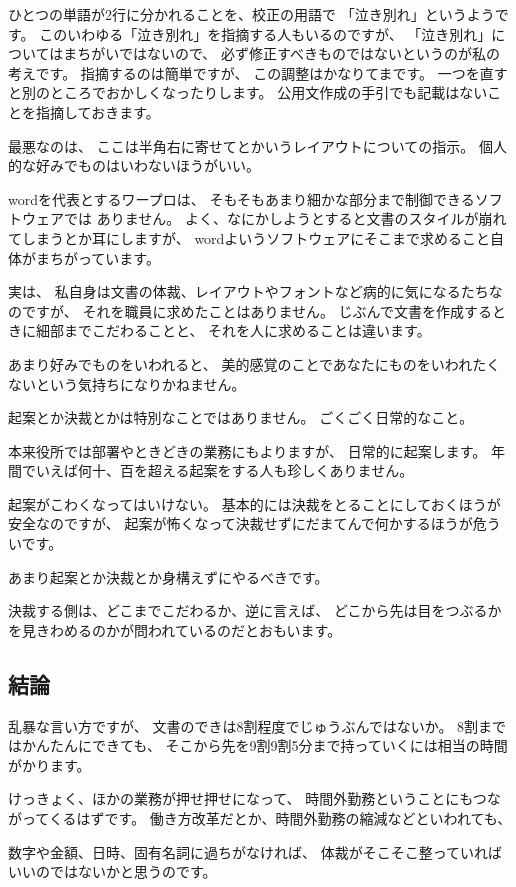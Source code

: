 \documentclass[uplatex,jis2004,dvipdfmx,12pt]{jsarticle}
\begin{document}
ひとつの単語が2行に分かれることを、校正の用語で
「泣き別れ」というようです。
このいわゆる「泣き別れ」を指摘する人もいるのですが、
「泣き別れ」についてはまちがいではないので、
必ず修正すべきものではないというのが私の考えです。
指摘するのは簡単ですが、
この調整はかなりてまです。
一つを直すと別のところでおかしくなったりします。
公用文作成の手引でも記載はないことを指摘しておきます。


最悪なのは、
ここは半角右に寄せてとかいうレイアウトについての指示。
個人的な好みでものはいわないほうがいい。


wordを代表とするワープロは、
そもそもあまり細かな部分まで制御できるソフトウェアでは
ありません。
よく、なにかしようとすると文書のスタイルが崩れてしまうとか耳にしますが、
wordよいうソフトウェアにそこまで求めること自体がまちがっています。


実は、
私自身は文書の体裁、レイアウトやフォントなど病的に気になるたちなのですが、
それを職員に求めたことはありません。
じぶんで文書を作成するときに細部までこだわることと、
それを人に求めることは違います。

あまり好みでものをいわれると、
美的感覚のことであなたにものをいわれたくないという気持ちになりかねません。


起案とか決裁とかは特別なことではありません。
ごくごく日常的なこと。

本来役所では部署やときどきの業務にもよりますが、
日常的に起案します。
年間でいえば何十、百を超える起案をする人も珍しくありません。

起案がこわくなってはいけない。
基本的には決裁をとることにしておくほうが安全なのですが、
起案が怖くなって決裁せずにだまてんで何かするほうが危ういです。

あまり起案とか決裁とか身構えずにやるべきです。

決裁する側は、どこまでこだわるか、逆に言えば、
どこから先は目をつぶるかを見きわめるのかが問われているのだとおもいます。

\subsection{結論}
乱暴な言い方ですが、
文書のできは8割程度でじゅうぶんではないか。
8割まではかんたんにできても、
そこから先を9割9割5分まで持っていくには相当の時間がかります。

けっきょく、ほかの業務が押せ押せになって、
時間外勤務ということにもつながってくるはずです。
働き方改革だとか、時間外勤務の縮減などといわれても、


数字や金額、日時、固有名詞に過ちがなければ、
体裁がそこそこ整っていればいいのではないかと思うのです。
\end{document}
